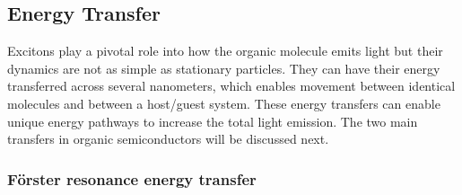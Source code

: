 \documentclass[
  letterpaper,
  DIV=11,
  numbers=noendperiod,
  oneside]{scrreprt}
\begin{document}
\hypertarget{energy-transfer}{%
\subsection{Energy Transfer}\label{energy-transfer}}

Excitons play a pivotal role into how the organic molecule emits light
but their dynamics are not as simple as stationary particles. They can
have their energy transferred across several nanometers, which enables
movement between identical molecules and between a host/guest system.
These energy transfers can enable unique energy pathways to increase the
total light emission. The two main transfers in organic semiconductors
will be discussed next.

\hypertarget{fuxf6rster-resonance-energy-transfer}{%
\subsubsection{Förster resonance energy
transfer}\label{fuxf6rster-resonance-energy-transfer}}
\end{document}
